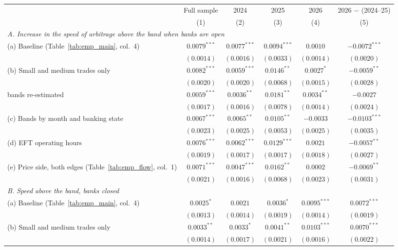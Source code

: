 \begin{tabular}{lccccc}
\toprule
 & Full sample & 2024 & 2025 & 2026 & 2026 $-$ (2024--25) \\
 & (1) & (2) & (3) & (4) & (5) \\
\midrule
\multicolumn{6}{l}{\emph{A. Increase in the speed of arbitrage above the band when banks are open}} \\
(a) Baseline (Table~\ref{tab:emp_main}, col.\ 4) & $0.0079^{***}$ & $0.0077^{***}$ & $0.0094^{***}$ & $0.0010$ & $-0.0072^{***}$ \\
 & $(0.0014)$ & $(0.0016)$ & $(0.0033)$ & $(0.0014)$ & $(0.0020)$ \\
(b) Small and medium trades only & $0.0082^{***}$ & $0.0059^{***}$ & $0.0146^{**}$ & $0.0027^{*}$ & $-0.0059^{**}$ \\
 & $(0.0020)$ & $(0.0020)$ & $(0.0068)$ & $(0.0015)$ & $(0.0028)$ \\
\quad bands re-estimated & $0.0059^{***}$ & $0.0036^{**}$ & $0.0181^{**}$ & $0.0034^{**}$ & $-0.0027$ \\
 & $(0.0017)$ & $(0.0016)$ & $(0.0078)$ & $(0.0014)$ & $(0.0024)$ \\
(c) Bands by month and banking state & $0.0067^{***}$ & $0.0065^{**}$ & $0.0105^{**}$ & $-0.0033$ & $-0.0103^{***}$ \\
 & $(0.0023)$ & $(0.0025)$ & $(0.0053)$ & $(0.0025)$ & $(0.0035)$ \\
(d) EFT operating hours & $0.0076^{***}$ & $0.0062^{***}$ & $0.0129^{***}$ & $0.0021$ & $-0.0057^{**}$ \\
 & $(0.0019)$ & $(0.0017)$ & $(0.0017)$ & $(0.0018)$ & $(0.0027)$ \\
(e) Price side, both edges (Table~\ref{tab:emp_flow}, col.\ 1) & $0.0071^{***}$ & $0.0047^{***}$ & $0.0162^{**}$ & $0.0002$ & $-0.0069^{**}$ \\
 & $(0.0021)$ & $(0.0016)$ & $(0.0068)$ & $(0.0023)$ & $(0.0031)$ \\
\multicolumn{6}{l}{\emph{B. Speed above the band, banks closed}} \\
(a) Baseline (Table~\ref{tab:emp_main}, col.\ 4) & $0.0025^{*}$ & $0.0021$ & $0.0036^{*}$ & $0.0095^{***}$ & $0.0072^{***}$ \\
 & $(0.0013)$ & $(0.0014)$ & $(0.0019)$ & $(0.0014)$ & $(0.0019)$ \\
(b) Small and medium trades only & $0.0033^{**}$ & $0.0033^{*}$ & $0.0041^{**}$ & $0.0103^{***}$ & $0.0070^{***}$ \\
 & $(0.0014)$ & $(0.0017)$ & $(0.0021)$ & $(0.0016)$ & $(0.0022)$ \\

\end{tabular}
